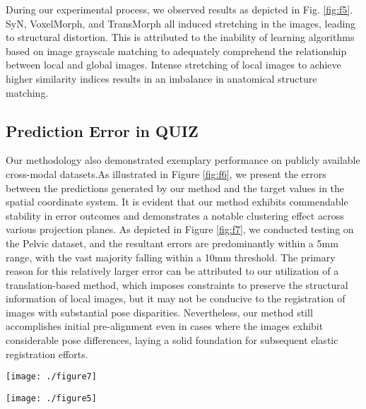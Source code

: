 \documentclass[preprint,review,12pt]{elsarticle}
\begin{document}
During our experimental process, we observed results as depicted in Fig. \ref{fig:f5}. SyN, VoxelMorph, and TransMorph all induced stretching in the images, leading to structural distortion. This is attributed to the inability of learning algorithms based on image grayscale matching to adequately comprehend the relationship between local and global images. Intense stretching of local images to achieve higher similarity indices results in an imbalance in anatomical structure matching.

\subsection{Prediction Error in QUIZ}

Our methodology also demonstrated exemplary performance on publicly available cross-modal datasets.As illustrated in Figure \ref{fig:f6}, we present the errors between the predictions generated by our method and the target values in the spatial coordinate system. It is evident that our method exhibits commendable stability in error outcomes and demonstrates a notable clustering effect across various projection planes. As depicted in Figure \ref{fig:f7}, we conducted testing on the Pelvic dataset, and the resultant errors are predominantly within a 5mm range, with the vast majority falling within a 10mm threshold. The primary reason for this relatively larger error can be attributed to our utilization of a translation-based method, which imposes constraints to preserve the structural information of local images, but it may not be conducive to the registration of images with substantial pose disparities. Nevertheless, our method still accomplishes initial pre-alignment even in cases where the images exhibit considerable pose differences, laying a solid foundation for subsequent elastic registration efforts.

\begin{figure*}[htb]
	\centering
	\texttt{[image: ./figure7]}
	\caption{Illustration of the prediction errors observed in the A-P (Anterior-Posterior), L-R (Left-Right), and S-I (Superior-Inferior) directions. The majority of data points exhibit errors within a 5mm range, with the vast majority of points demonstrating errors within a 10mm threshold. It is noteworthy that this is solely achieved through rigid transformation.}
	\label{fig:f7}
\end{figure*}

\begin{figure*}[htb]
	\centering
	\texttt{[image: ./figure5]}
	\caption{Illustration of cross-modal registration results for a given image pair. The gray area represents the CT image, while the red area signifies the warped CBCT image. It is worth noting that due to the large difference in world coordinates between CT and CBCT, the image coordinates are shown here.}
	\label{fig:f8}
\end{figure*}
\end{document}
